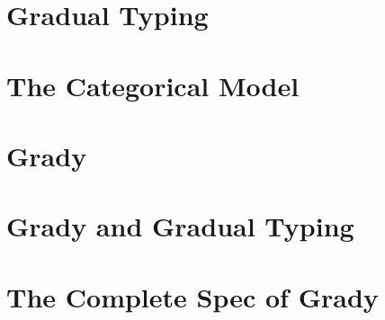 \documentclass[preprint]{sigplanconf}
\begin{document}
\section{Gradual Typing}
\label{sec:gradual_typing}


\section{The Categorical Model}
\label{sec:categorical_model}


\section{Grady}
\label{sec:grady}


\section{Grady and Gradual Typing}
\label{sec:grady_and_gradual_typing}



\nocite{*}



\appendix

\section{The Complete Spec of Grady}
\label{sec:the_complete_spec_of_grady}
\Gradyall{}
\end{document}
